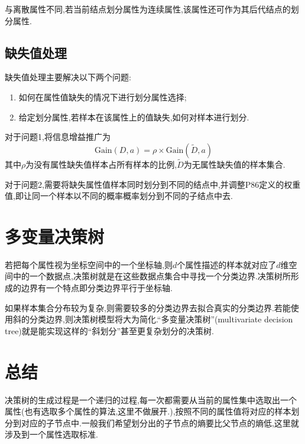 与离散属性不同,若当前结点划分属性为连续属性,该属性还可作为其后代结点的划分属性.

\subsection{缺失值处理}

缺失值处理主要解决以下两个问题:

\begin{enumerate}
\item 如何在属性值缺失的情况下进行划分属性选择;
\item 给定划分属性,若样本在该属性上的值缺失,如何对样本进行划分.
\end{enumerate}

对于问题1,将信息增益推广为
\begin{equation}
\text{Gain}(D,a)=\rho\times\text{Gain}(\tilde D,a)
\end{equation}
其中$\rho$为没有属性缺失值样本占所有样本的比例,$\tilde D$为无属性缺失值的样本集合.

对于问题2,需要将缺失属性值样本同时划分到不同的结点中,并调整P86定义的权重值,即让同一个样本以不同的概率概率划分到不同的子结点中去.

\section{多变量决策树}

若把每个属性视为坐标空间中的一个坐标轴,则$d$个属性描述的样本就对应了$d$维空间中的一个数据点,决策树就是在这些数据点集合中寻找一个分类边界.决策树所形成的边界有一个特点即分类边界平行于坐标轴.

如果样本集合分布较为复杂,则需要较多的分类边界去拟合真实的分类边界.若能使用斜的分类边界,则决策树模型将大为简化.``多变量决策树''(multivariate decision tree)就是能实现这样的``斜划分''甚至更复杂划分的决策树.

\section*{总结}

决策树的生成过程是一个递归的过程,每一次都需要从当前的属性集中选取出一个属性(也有选取多个属性的算法,这里不做展开.),按照不同的属性值将对应的样本划分到对应的子节点中.一般我们希望划分出的子节点的熵要比父节点的熵低,这里就涉及到一个属性选取标准.

